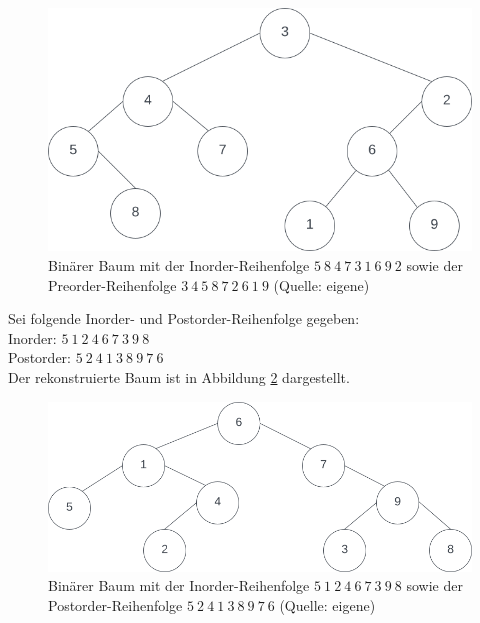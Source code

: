 \begin{figure}
    \begin{center}
        \includegraphics[scale=0.4]{chapters/Datenstrukturen und Algorithmen/img/inpre}
        \caption{Binärer Baum mit der Inorder-Reihenfolge $5\ 8\ 4\ 7\ 3\ 1\ 6\ 9\ 2$ sowie der Preorder-Reihenfolge $3\ 4\ 5\ 8\ 7\ 2\ 6\ 1\ 9$  (Quelle: eigene)}
        \label{fig:inpre}
    \end{center}
\end{figure}

\noindent
Sei folgende Inorder- und Postorder-Reihenfolge gegeben:\\

\noindent
Inorder: $5\ 1\ 2\ 4\ 6\ 7\ 3\ 9\ 8$\\
Postorder: $5\ 2\ 4\ 1\ 3\ 8\ 9\ 7\ 6$\\

\noindent
Der rekonstruierte Baum ist in Abbildung \ref{fig:inpost} dargestellt.


\begin{figure}
    \begin{center}
        \includegraphics[scale=0.4]{chapters/Datenstrukturen und Algorithmen/img/inpost}
        \caption{Binärer Baum mit der Inorder-Reihenfolge $5\ 1\ 2\ 4\ 6\ 7\ 3\ 9\ 8$ sowie der Postorder-Reihenfolge $5\ 2\ 4\ 1\ 3\ 8\ 9\ 7\ 6$  (Quelle: eigene)}
        \label{fig:inpost}
    \end{center}
\end{figure}


